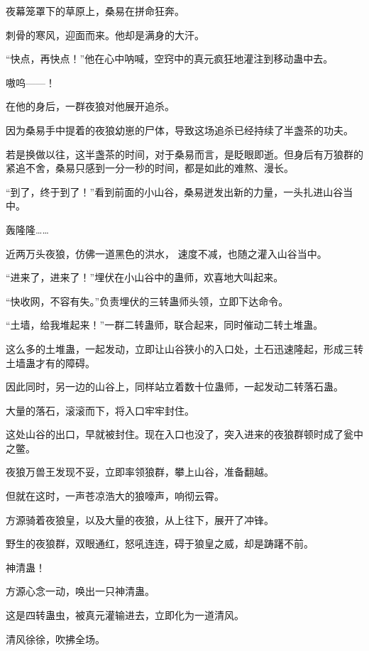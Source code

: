 
\begin{this_body}

夜幕笼罩下的草原上，桑易在拼命狂奔。

刺骨的寒风，迎面而来。他却是满身的大汗。

“快点，再快点！”他在心中呐喊，空窍中的真元疯狂地灌注到移动蛊中去。

嗷呜——！

在他的身后，一群夜狼对他展开追杀。

因为桑易手中提着的夜狼幼崽的尸体，导致这场追杀已经持续了半盏茶的功夫。

若是换做以往，这半盏茶的时间，对于桑易而言，是眨眼即逝。但身后有万狼群的紧追不舍，桑易只感到一分一秒的时间，都是如此的难熬、漫长。

“到了，终于到了！”看到前面的小山谷，桑易迸发出新的力量，一头扎进山谷当中。

轰隆隆……

近两万头夜狼，仿佛一道黑色的洪水，  速度不减，也随之灌入山谷当中。

“进来了，进来了！”埋伏在小山谷中的蛊师，欢喜地大叫起来。

“快收网，不容有失。”负责埋伏的三转蛊师头领，立即下达命令。

“土墙，给我堆起来！”一群二转蛊师，联合起来，同时催动二转土堆蛊。

这么多的土堆蛊，一起发动，立即让山谷狭小的入口处，土石迅速隆起，形成三转土墙蛊才有的障碍。

因此同时，另一边的山谷上，同样站立着数十位蛊师，一起发动二转落石蛊。

大量的落石，滚滚而下，将入口牢牢封住。

这处山谷的出口，早就被封住。现在入口也没了，突入进来的夜狼群顿时成了瓮中之鳖。

夜狼万兽王发现不妥，立即率领狼群，攀上山谷，准备翻越。

但就在这时，一声苍凉浩大的狼嚎声，响彻云霄。

方源骑着夜狼皇，以及大量的夜狼，从上往下，展开了冲锋。

野生的夜狼群，双眼通红，怒吼连连，碍于狼皇之威，却是踌躇不前。

神清蛊！

方源心念一动，唤出一只神清蛊。

这是四转蛊虫，被真元灌输进去，立即化为一道清风。

清风徐徐，吹拂全场。


\end{this_body}
